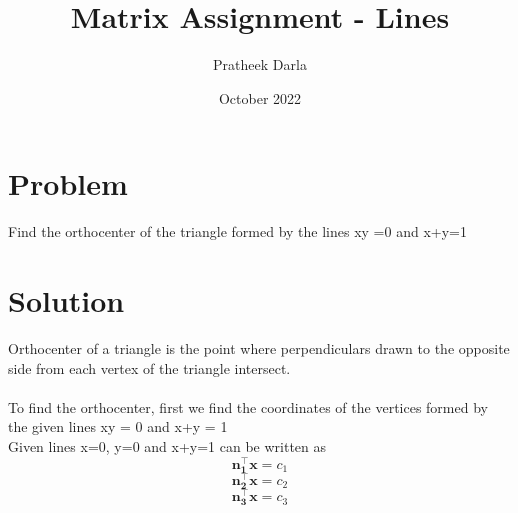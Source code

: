 \documentclass[journal,12pt,twocolumn]{IEEEtran}
\title{\mytitle}
\title{
Matrix Assignment - Lines
}
\author{Pratheek Darla}
\date{October 2022}
\let\vec\mathbf
\begin{document}
\maketitle
\tableofcontents
\bigskip


\section{\textbf{Problem}}
Find the orthocenter of the triangle formed by the lines xy =0
and x+y=1\\


\section{\textbf{Solution}}
Orthocenter of a triangle is the point where perpendiculars drawn to the opposite side from each vertex of the triangle intersect.   \\
\\
To find the orthocenter, first we find the coordinates of the vertices formed by the given lines xy = 0 and x+y = 1\\

Given lines x=0, y=0 and x+y=1 can be written as\\
\begin{equation}
\vec{n_1^{\top}} \vec{x} = c_1    \label{eq-1}
\end{equation}
\begin{equation}
\vec{n_2^{\top}} \vec{x} = c_2    \label{eq-2}
\end{equation}
\begin{equation}
\vec{n_3^{\top}} \vec{x} = c_3    \label{eq-3}
\end{equation}
\end{document}
